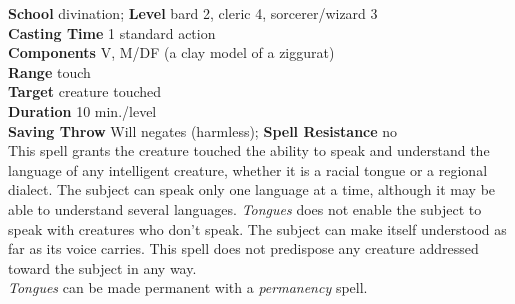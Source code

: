 \textbf{School} divination; \textbf{Level} bard 2, cleric 4, sorcerer/wizard 3\\
\textbf{Casting Time} 1 standard action\\
\textbf{Components} V, M/DF (a clay model of a ziggurat)\\
\textbf{Range} touch\\
\textbf{Target} creature touched\\
\textbf{Duration} 10 min./level\\
\textbf{Saving Throw }Will negates (harmless); \textbf{Spell Resistance} no\\
This spell grants the creature touched the ability to speak and understand the language of any intelligent creature, whether it is a racial tongue or a regional dialect. The subject can speak only one language at a time, although it may be able to understand several languages. \textit{Tongues }does not enable the subject to speak with creatures who don't speak. The subject can make itself understood as far as its voice carries. This spell does not predispose any creature addressed toward the subject in any way.\\
\textit{Tongues }can be made permanent with a \textit{permanency }spell.\\
